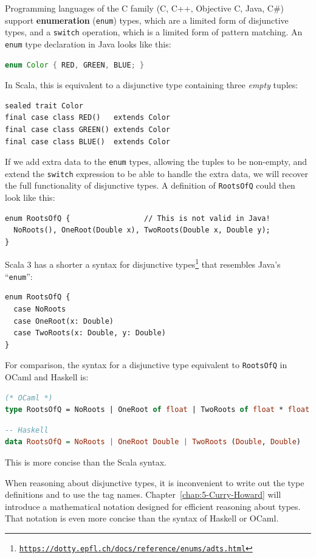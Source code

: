 Programming languages of the C family (C, C++, Objective C, Java,
C\#) support \textbf{enumeration} (\lstinline!enum!) types,
which are a limited form of disjunctive types, and a \lstinline!switch!
operation, which is a limited form of pattern matching. An \lstinline!enum!
type declaration in Java looks like this:
\begin{lstlisting}[language=Java]
enum Color { RED, GREEN, BLUE; } 
\end{lstlisting}
In Scala, this is equivalent to a disjunctive type containing three
\emph{empty} tuples:
\begin{lstlisting}
sealed trait Color
final case class RED()   extends Color
final case class GREEN() extends Color
final case class BLUE()  extends Color
\end{lstlisting}
If we add extra data to the \lstinline!enum! types, allowing the
tuples to be non-empty, and extend the \lstinline!switch! expression
to be able to handle the extra data, we will recover the full functionality
of disjunctive types. A definition of \lstinline!RootsOfQ! could
then look like this: 
\begin{lstlisting}
enum RootsOfQ {                 // This is not valid in Java!
  NoRoots(), OneRoot(Double x), TwoRoots(Double x, Double y);
}
\end{lstlisting}
Scala 3 has a shorter a syntax for disjunctive types\footnote{\texttt{\href{https://dotty.epfl.ch/docs/reference/enums/adts.html}{https://dotty.epfl.ch/docs/reference/enums/adts.html}}}
that resembles Java\textsf{'}s \textsf{``}\lstinline!enum!\textsf{''}:
\begin{lstlisting}
enum RootsOfQ {
  case NoRoots
  case OneRoot(x: Double)
  case TwoRoots(x: Double, y: Double)
}
\end{lstlisting}
For comparison, the syntax for a disjunctive type equivalent to \lstinline!RootsOfQ!
in OCaml and Haskell is:
\begin{lstlisting}[language=Caml]
(* OCaml *)
type RootsOfQ = NoRoots | OneRoot of float | TwoRoots of float * float
\end{lstlisting}
\begin{lstlisting}[language=Haskell]
-- Haskell
data RootsOfQ = NoRoots | OneRoot Double | TwoRoots (Double, Double)
\end{lstlisting}
This is more concise than the Scala syntax. 

When reasoning about disjunctive types, it is inconvenient to write
out the type definitions and to use the tag names. Chapter~\ref{chap:5-Curry-Howard}
will introduce a mathematical notation designed for efficient reasoning
about types. That notation is even more concise than the syntax of
Haskell or OCaml.

